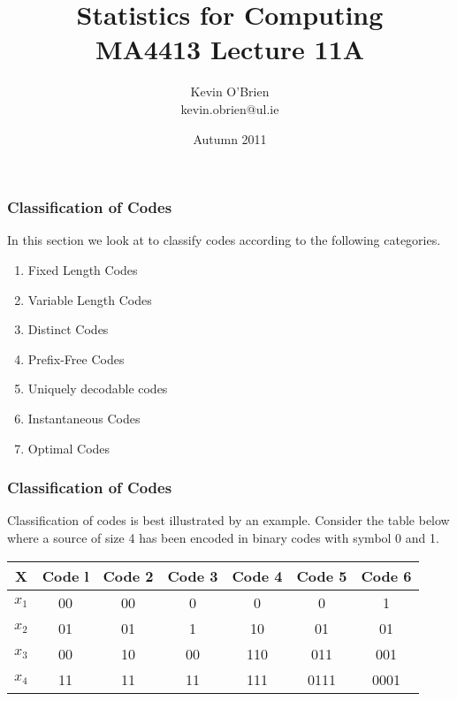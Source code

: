 \documentclass[a4]{beamer}
\title[MA4413]{Statistics for Computing \\ {\normalsize MA4413 Lecture 11A}}
\author[Kevin O'Brien]{Kevin O'Brien \\ {\scriptsize kevin.obrien@ul.ie}}
\date{Autumn 2011}
\institute[Maths \& Stats]{Dept. of Mathematics \& Statistics, \\ University \textit{of} Limerick}
\begin{document}
\begin{frame}
\frametitle{Classification of Codes}
In this section we look at to classify codes according to the following categories.
\begin{enumerate}
\item Fixed Length Codes
\item Variable Length Codes
\item Distinct Codes
\item Prefix-Free Codes
\item Uniquely decodable codes
\item Instantaneous Codes
\item Optimal Codes
\end{enumerate}
\end{frame}
\begin{frame}
\frametitle{Classification of Codes}
Classification of codes is best illustrated by an example. Consider the table below where a source of
size 4 has been encoded in binary codes with symbol 0 and 1.\\ \bigskip
\begin{center}
\begin{tabular}{|c| c| c| c| c| c| c|}
\hline
X& Code l& Code 2& Code 3 &Code 4& Code 5& Code 6\\\hline
$x_1$& 00& 00 &0 &0 &0 &1\\
$x_2$& 01& 01 &1 &10 &01 &01\\
$x_3$ &00 &10& 00& 110& 011 &001\\
$x_4$ &11& 11& 11& 111 &0111 &0001\\\hline
\end{tabular}
\end{center}
\end{frame}
\end{document}
